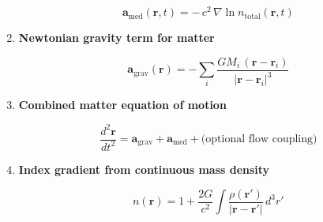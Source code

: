 \documentclass{article}
\begin{document}
\begin{enumerate}
\[
    \mathbf{a}_{\mathrm{med}}(\mathbf{r}, t) = -\,c^2 \,\nabla \ln n_{\mathrm{total}}(\mathbf{r}, t)
    \]



    \item \textbf{Newtonian gravity term for matter}
    

\[
    \mathbf{a}_{\mathrm{grav}}(\mathbf{r}) = - \sum_i \frac{G M_i \, (\mathbf{r} - \mathbf{r}_i)}{\lvert \mathbf{r} - \mathbf{r}_i \rvert^3}
    \]



    \item \textbf{Combined matter equation of motion}
    

\[
    \frac{d^2 \mathbf{r}}{dt^2} = \mathbf{a}_{\mathrm{grav}} + \mathbf{a}_{\mathrm{med}} + \text{(optional flow coupling)}
    \]



    \item \textbf{Index gradient from continuous mass density}
    

\[
    n(\mathbf{r}) = 1 + \frac{2G}{c^2} \int \frac{\rho(\mathbf{r}')}{\lvert \mathbf{r} - \mathbf{r}' \rvert} \, d^3 r'
    \]


\end{enumerate}
\end{document}

